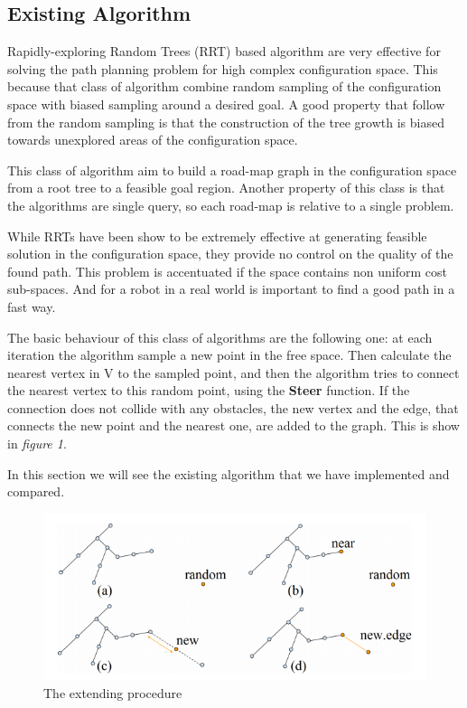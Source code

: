 \documentclass[10pt]{article}
\begin{document}
	\subsection{Existing Algorithm}

	Rapidly-exploring Random Trees (RRT) based algorithm are very effective for solving the path planning problem for high complex configuration space. This because that class of algorithm combine random sampling of the configuration space with biased sampling around a desired goal. A good property that follow from the random sampling is that the construction of the tree growth is biased towards unexplored areas of the configuration space.
	
	This class of algorithm aim to build a road-map graph in the configuration space from a root tree to a feasible goal region. Another property of this class is that the algorithms are single query, so each road-map is relative to a single problem. 
	
	While RRTs have been show to be extremely effective at generating feasible solution in the configuration space, they provide no control on the quality of the found path. This problem is accentuated if the space contains non uniform cost sub-spaces. And for a robot in a real world is important to find a good path in a fast way.
	
	The basic behaviour of this class of algorithms are the following one: at each iteration the algorithm  sample a new point in the free space. Then calculate the nearest vertex in V to the sampled point, and then the algorithm tries to connect the nearest vertex to this random point, using the \textbf{Steer} function. If the connection does not collide with any obstacles, the new vertex and the edge, that connects the new point and the nearest one, are added to the graph. This is show in \textit{figure 1}.
	
	In this section we will see the existing algorithm that we have implemented and compared.
	
	\FloatBarrier
	\begin{figure}
		\centering
		\includegraphics[width=\linewidth]{rrtExt.png}
		\caption{The extending procedure}
	\end{figure}
	\FloatBarrier
\end{document}
